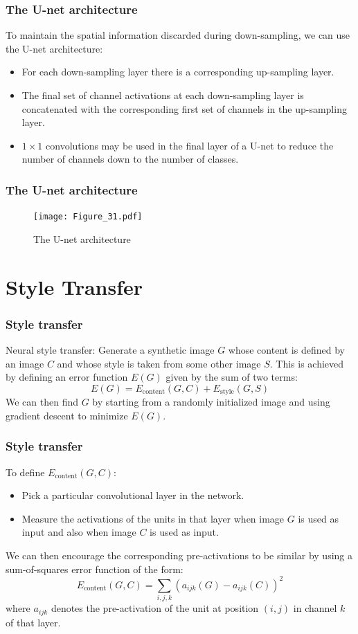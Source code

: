 \documentclass{beamer}
\begin{document}
\begin{frame}
    \frametitle{The U-net architecture}
    To maintain the spatial information discarded during down-sampling, we can use the U-net architecture:
    \begin{itemize}
        \item For each down-sampling layer there is a corresponding up-sampling layer.
        \item The final set of channel activations at each down-sampling layer is concatenated with the corresponding first set of channels in the up-sampling layer.
        \item $1\times{}1$ convolutions may be used in the final layer of a U-net to reduce the number of channels down to the number of classes.
    \end{itemize}
\end{frame}

\begin{frame}
    \frametitle{The U-net architecture}
    \begin{figure}
        \caption{The U-net architecture}
        \texttt{[image: Figure\_31.pdf]}
    \end{figure}
\end{frame}

\section{Style Transfer}

\begin{frame}
    \frametitle{Style transfer}
    Neural style transfer: Generate a synthetic image $G$ whose content is defined by an image $C$ and whose style is taken from some other image $S$. This is achieved by defining an error function $E(G)$ given by the sum of two terms:
    \begin{equation*}
        E(G)=E_{\textrm{content}}(G,C)+E_{\textrm{style}}(G,S)
    \end{equation*}
    We can then find $G$ by starting from a randomly initialized image and using gradient descent to minimize $E(G)$.
\end{frame}

\begin{frame}
    \frametitle{Style transfer}
    To define $E_{\textrm{content}}(G,C)$:
    \begin{itemize}
        \item Pick a particular convolutional layer in the network.
        \item Measure the activations of the units in that layer when image $G$ is used as input and also when image $C$ is used as input.
    \end{itemize}
    We can then encourage the corresponding pre-activations to be similar by using a sum-of-squares error function of the form:
    \begin{equation*}
        E_{\textrm{content}}(G,C)=\sum_{i,j,k}(a_{ijk}(G)-a_{ijk}(C))^{2}
    \end{equation*}
    where $a_{ijk}$ denotes the pre-activation of the unit at position $(i,j)$ in channel $k$ of that layer.
\end{frame}
\end{document}
